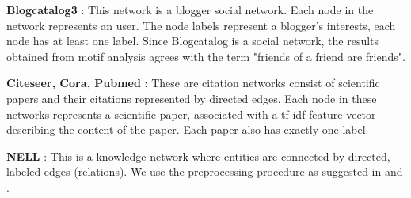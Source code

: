 \documentclass{article}
\theoremstyle{definition}
\begin{document}
\textbf{Blogcatalog3} \cite{blogcatalog}: This network is a blogger social network.
Each node in the network represents an user. The node labels represent a blogger's 
interests, each node has at least one label. Since Blogcatalog is a social network, 
the results obtained from motif analysis agrees with the term "friends of a friend 
are friends".

\textbf{Citeseer, Cora, Pubmed} \cite{crp}: These are citation 
networks consist of scientific papers and their citations represented by directed 
edges. Each node in these networks represents a scientific paper, associated
with a tf-idf feature vector describing the content of the paper. Each paper
also has exactly one label.

\textbf{NELL} \cite{nell}: This is a knowledge network where entities are connected
by directed, labeled edges (relations). We use the preprocessing procedure as
suggested in \cite{gcn} and \cite{planetoid}.

\begin{table}
\centering
{}
\caption{Datasets for unsupervised embeddings}
\label{t:ungraph}
\end{table}
\end{document}
